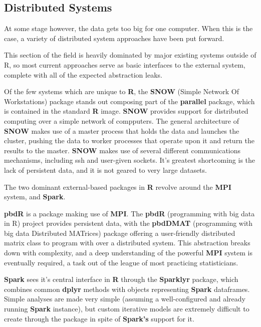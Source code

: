 \subsection{Distributed Systems}

At some stage however, the data gets too big for one computer.
When this is the case, a variety of distributed system approaches have been put forward.

This section of the field is heavily dominated by major existing systems outside of R, so most current approaches serve as basic interfaces to the external system, complete with all of the expected abstraction leaks\cite{spolsky2002abstraction}.

Of the few systems which are unique to \textbf{R}, the \textbf{SNOW} (Simple Network Of Workstations) package stands out composing part of the \textbf{parallel} package, which is contained in the standard \textbf{R} image.
\textbf{SNOW} provides support for distributed computing over a simple network of compputers.
The general architecture of \textbf{SNOW} makes use of a master process that holds the data and launches the cluster, pushing the data to worker processes that operate upon it and return the results to the master.
\textbf{SNOW} makes use of several different communications mechanisms, including ssh and user-given sockets.
It's greatest shortcoming is the lack of persistent data, and it is not geared to very large datasets.

The two dominant external-based packages in \textbf{R} revolve around the \textbf{MPI} system, and \textbf{Spark}.

\textbf{pbdR} is a package making use of \textbf{MPI}.
The \textbf{pbdR} (programming with big data in R) project provides persistent data, with the \textbf{pbdDMAT} (programming with big data Distributed MATrices) package offering a user-friendly distributed matrix class to program with over a distributed system.
This abstraction breaks down with complexity, and a deep understanding of the powerful \textbf{MPI} system is eventually required, a task out of the league of most practicing statisticians.

\textbf{Spark} sees it's central interface in \textbf{R} through the \textbf{Sparklyr} package, which combines common \textbf{dplyr} methods with objects representing \textbf{Spark} dataframes.
Simple analyses are made very simple (assuming a well-configured and already running \textbf{Spark} instance), but custom iterative models are extremely difficult to create through the package in spite of \textbf{Spark's} support for it.

